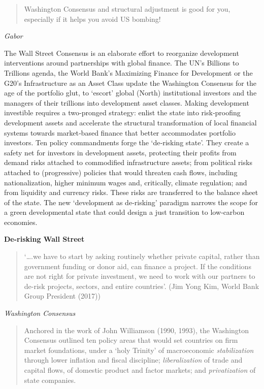 \documentclass[
]{book}
\begin{document}
\begin{quote}
Washington Consensus and structural adjustment is good for you,
especially if it helps you avoid US bombing!
\end{quote}

\emph{Gabor}

The Wall Street Consensus is an elaborate effort to reorganize development interventions around partnerships with global finance. The UN's Billions to Trillions agenda, the World Bank's Maximizing Finance for Development or the G20's Infrastructure as an Asset Class update the Washington Consensus for the age of the portfolio glut, to `escort' global (North) institutional investors and the managers of their trillions into development asset classes. Making development investible requires a two‐pronged strategy: enlist the state into risk‐proofing development assets and accelerate the structural transformation of local financial systems towards market‐based finance that better accommodates portfolio investors. Ten policy commandments forge the `de‐risking state'. They create a safety net for investors in development assets, protecting their profits from demand risks attached to commodified infrastructure assets; from political risks attached to (progressive) policies that would threaten cash flows, including nationalization, higher minimum wages and, critically, climate regulation; and from liquidity and currency risks. These risks are transferred to the balance sheet of the state. The new `development as de‐risking' paradigm narrows the scope for a green developmental state that could design a just transition to low‐carbon economies.

\textbf{De-risking Wall Street}

\begin{quote}
`\ldots.we have to start by asking routinely whether private capital,
rather than government funding or donor aid, can finance a
project. If the conditions are not right for private investment, we
need to work with our partners to de-risk projects, sectors, and
entire countries'.
(Jim Yong Kim, World Bank Group President (2017))
\end{quote}

\emph{Washington Consensus}

\begin{quote}
Anchored in the work of John Williamson (1990, 1993),
the Washington Consensus outlined ten policy areas that would set countries on firm
market foundations, under a `holy Trinity' of macroeconomic \emph{stabilization} through
lower inflation and fiscal discipline; \emph{liberalization} of trade and capital flows, of
domestic product and factor markets; and \emph{privatization} of state companies.
\end{quote}
\end{document}
